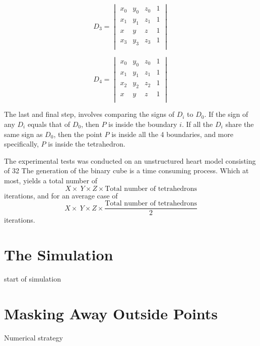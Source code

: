 \[
D_{3} =
\begin{vmatrix}
x_{0} & y_{0} & z_{0} & 1 \\ 
x_{1} & y_{1} & z_{1} & 1 \\ 
x & y & z & 1 \\ 
x_{3} & y_{3} & z_{3} & 1 \\ 
\end{vmatrix}
\]

\[
D_{4} =
\begin{vmatrix}
x_{0} & y_{0} & z_{0} & 1 \\ 
x_{1} & y_{1} & z_{1} & 1 \\ 
x_{2} & y_{2} & z_{2} & 1 \\ 
x & y & z & 1 \\ 
\end{vmatrix}
\]

The last and final step, involves comparing the signs of \(D_{i}\) to \(D_{0}\). If the sign of any \(D_{i}\) equals that of \(D_{0}\), then \(P\) is inside the boundary \(i\). If all the \(D_{i}\) share the same sign as \(D_{0}\), then the point \(P\) is inside all the 4 boundaries, and more specifically, \(P\) is inside the tetrahedron.


The experimental tests was conducted on an unstructured heart model consisting of 32
The generation of the binary cube is a time consuming process. Which at most, yields a total number of 
\begin{equation} 
X \times\ Y \times Z  \times \textrm{Total number of tetrahedrons}
\end{equation}  
iterations, and for an average case of 
\begin{equation} 
X \times\ Y \times Z  \times \frac{\textrm{Total number of tetrahedrons}}{2}
\end{equation} 
iterations.  

\section{The Simulation}
start of simulation

\section{Masking Away Outside Points}
Numerical strategy





